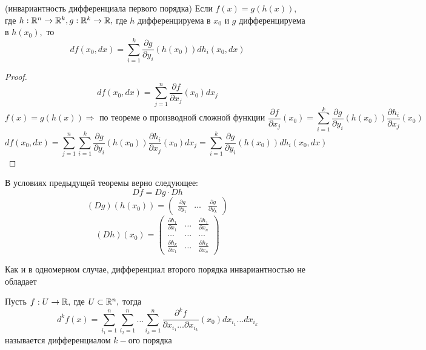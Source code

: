 	\begin{theorem}(инвариантность дифференциала первого порядка) Если  $f(x) = g(h(x))$, где $h : \mathbb{R}^n \to \mathbb{R}^k, g : \mathbb{R}^k \to \mathbb{R},$ где $h$ дифференцируема в $x_0$ и $g$ дифференцируема в $h(x_0),$ то 
	\[ df(x_0, dx) = \sum_{i = 1}^k\frac{\partial g}{\partial y_i}(h(x_0)) dh_i(x_0, dx) \]
\begin{proof}
	\[ df(x_0, dx) = \sum_{j = 1}^n\frac{\partial f}{\partial x_j}(x_0)dx_j \]
	\[ f(x) = g(h(x)) \Rightarrow \text{ по теореме о производной сложной функции } \frac{\partial f}{\partial x_j}(x_0) = \sum_{i = 1}^k\frac{\partial g}{\partial y_i}(h(x_0))\frac{\partial h_i}{\partial x_j}(x_0) \]
	\[ df(x_0, dx) = \sum_{j = 1}^n\sum_{i = 1}^k\frac{\partial g}{\partial y_i}(h(x_0))\frac{\partial h_i}{\partial x_j}(x_0)dx_j = \sum_{i = 1}^k\frac{\partial g}{\partial y_i}(h(x_0)) dh_i(x_0, dx) \]
\end{proof}
\end{theorem}

\begin{remark}
	В условиях предыдущей теоремы верно следующее:
	\[ Df = Dg \cdot Dh \]
	\[ (Dg)(h(x_0)) = \begin{pmatrix} \frac{\partial g}{\partial y_1} & \ldots & \frac{\partial g}{\partial y_k} \end{pmatrix} \]
	\[ (Dh)(x_0) = \begin{pmatrix} 	\frac{\partial h_1}{\partial x_1} & \ldots & \frac{\partial h_1}{\partial x_n}\\
						\ldots & \ldots & \ldots \\
						\frac{\partial h_k}{\partial x_1} & \ldots & \frac{\partial h_k}{\partial x_n} \end{pmatrix} \]
\end{remark}

\begin{remark}
	Как и в одномерном случае, дифференциал второго порядка инвариантностью не обладает
\end{remark}

\begin{claim}
	Пусть $f : U \to \mathbb{R},$ где $U \subset \mathbb{R}^n,$ тогда
	\[ d^kf(x) = \sum_{i_1 = 1}^n \sum_{i_2 = 1}^n \ldots \sum_{i_k = 1}^n \frac{\partial^kf}{\partial x_{i_1} \ldots \partial x_{i_k}}(x_0) dx_{i_1} \ldots dx_{i_k} \]
	называется дифференциалом $k-$ого порядка
\end{claim}








































